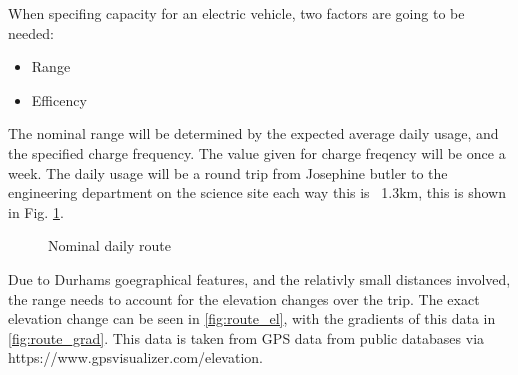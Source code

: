 \documentclass{article}
\begin{document}
When specifing capacity for an electric vehicle, two factors are going to be needed:
\begin{itemize}
    \item Range
    \item Efficency
\end{itemize}
The nominal range will be determined by the expected average daily usage, and the specified charge frequency. 
The value given for charge freqency will be once a week.
The daily usage will be a round trip from Josephine butler to the engineering department on the science site each way this is ~1.3km, this is shown in Fig. \ref{fig:route}.
\begin{figure}[H]
    \centering
    \caption{Nominal daily route}
    \label{fig:route}
\end{figure}
Due to Durhams goegraphical features, and the relativly small distances involved, the range needs to account for the elevation changes over the trip.
The exact elevation change can be seen in \ref{fig:route_el}, with the gradients of this data in \ref{fig:route_grad}.
This data is taken from GPS data from public databases via https://www.gpsvisualizer.com/elevation.
\end{document}
